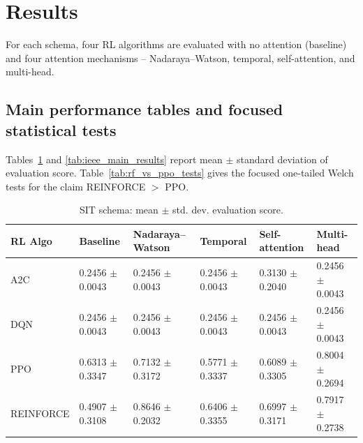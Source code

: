 

\section{Results} \label{sec:results} %
For each schema, four RL algorithms are evaluated with no attention (baseline) and four attention mechanisms -- Nadaraya--Watson, temporal, self-attention, and multi-head.

\subsection{Main performance tables and focused statistical tests}
\label{sec:hypothesis_tests}

Tables~\ref{tab:sit_main_results} and \ref{tab:ieee_main_results} report mean $\pm$ standard deviation of evaluation score. Table~\ref{tab:rf_vs_ppo_tests} gives the focused one-tailed Welch tests for the claim \textsc{REINFORCE} $>$ \textsc{PPO}.

\begin{table}[htbp]
	\centering
	\caption{SIT schema: mean $\pm$ std. dev. evaluation score.}
	\label{tab:sit_main_results}
	\begin{tabular}{l l l l l l}
	\toprule
	\textbf{RL Algo} & \textbf{Baseline} & \textbf{Nadaraya--Watson} & \textbf{Temporal} & \textbf{Self-attention} & \textbf{Multi-head}\\
	\midrule
	A2C & 0.2456 $\pm$ 0.0043 & 0.2456 $\pm$ 0.0043 & 0.2456 $\pm$ 0.0043 & 0.3130 $\pm$ 0.2040 & 0.2456 $\pm$ 0.0043\\
	DQN & 0.2456 $\pm$ 0.0043 & 0.2456 $\pm$ 0.0043 & 0.2456 $\pm$ 0.0043 & 0.2456 $\pm$ 0.0043 & 0.2456 $\pm$ 0.0043\\
	PPO & 0.6313 $\pm$ 0.3347 & 0.7132 $\pm$ 0.3172 & 0.5771 $\pm$ 0.3337 & 0.6089 $\pm$ 0.3305 & 0.8004 $\pm$ 0.2694\\
	REINFORCE & 0.4907 $\pm$ 0.3108 & 0.8646 $\pm$ 0.2032 & 0.6406 $\pm$ 0.3355 & 0.6997 $\pm$ 0.3171 & 0.7917 $\pm$ 0.2738\\
	\bottomrule
	\end{tabular}
\end{table}

